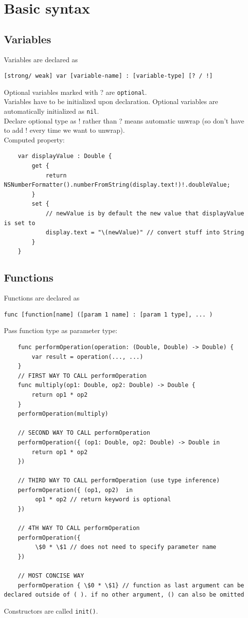 \documentclass[12pt]{report}
\newcommand{\co}{\texttt}
\begin{document}
\tableofcontents
\newpage
\chapter{Basic syntax}
\section{Variables}
Variables are declared as
\begin{lstlisting}
[strong/ weak] var [variable-name] : [variable-type] [? / !]
\end{lstlisting}
Optional variables marked with ? are \co{optional}.\\
Variables have to be initialized upon declaration. Optional variables are automatically initialized as \co{nil}. \\
Declare optional type as ! rather than ? means automatic unwrap (so don't have to add ! every time we want to unwrap). \\
Computed property:
\begin{lstlisting}
	var displayValue : Double {
		get {
			return NSNumberFormatter().numberFromString(display.text!)!.doubleValue;
		}
		set {
			// newValue is by default the new value that displayValue is set to
			display.text = "\(newValue)" // convert stuff into String
		}
	}
\end{lstlisting}

\section{Functions}
Functions are declared as
\begin{lstlisting}
func [function[name] ([param 1 name] : [param 1 type], ... )
\end{lstlisting}
Pass function type as parameter type:
\begin{lstlisting}
	func performOperation(operation: (Double, Double) -> Double) {
		var result = operation(..., ...)
	}
	// FIRST WAY TO CALL performOperation
	func multiply(op1: Double, op2: Double) -> Double {
		return op1 * op2
	}
	performOperation(multiply)
	
	// SECOND WAY TO CALL performOperation
	performOperation({ (op1: Double, op2: Double) -> Double in 
		return op1 * op2
	})
	
	// THIRD WAY TO CALL performOperation (use type inference)
	performOperation({ (op1, op2)  in 
		 op1 * op2 // return keyword is optional
	})
	
	// 4TH WAY TO CALL performOperation
	performOperation({ 
		 \$0 * \$1 // does not need to specify parameter name
	})
	
	// MOST CONCISE WAY
	performOperation { \$0 * \$1} // function as last argument can be declared outside of ( ). if no other argument, () can also be omitted
\end{lstlisting}
Constructors are called \co{init()}.
\end{document}
